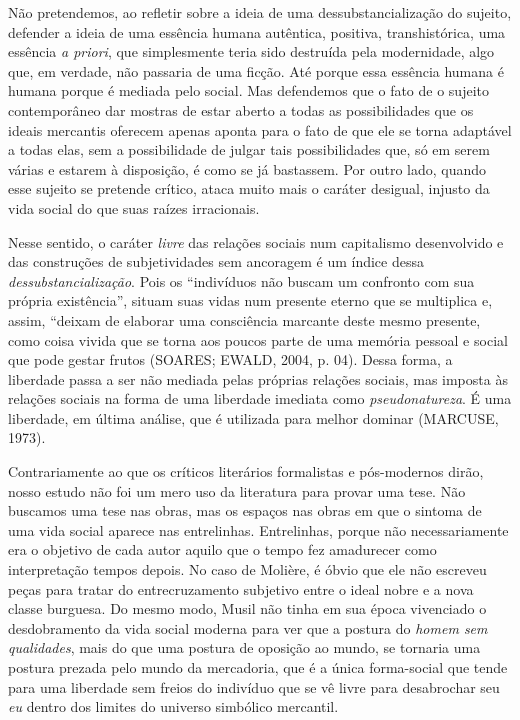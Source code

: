 Não pretendemos, ao refletir sobre a ideia de uma dessubstancialização
do sujeito, defender a ideia de uma essência humana autêntica, positiva,
transhistórica, uma essência \emph{a priori}, que simplesmente teria
sido destruída pela modernidade, algo que, em verdade, não passaria de
uma ficção. Até porque essa essência humana é humana porque é mediada
pelo social. Mas defendemos que o fato de o sujeito contemporâneo dar
mostras de estar aberto a todas as possibilidades que os ideais
mercantis oferecem apenas aponta para o fato de que ele se torna
adaptável a todas elas, sem a possibilidade de julgar tais
possibilidades que, só em serem várias e estarem à disposição, é como se
já bastassem. Por outro lado, quando esse sujeito se pretende crítico,
ataca muito mais o caráter desigual, injusto da vida social do que suas
raízes irracionais.

Nesse sentido, o caráter \emph{livre} das relações sociais num
capitalismo desenvolvido e das construções de subjetividades sem
ancoragem é um índice dessa \emph{dessubstancialização}. Pois os
``indivíduos não buscam um confronto com sua própria existência'',
situam suas vidas num presente eterno que se multiplica e, assim,
``deixam de elaborar uma consciência marcante deste mesmo presente, como
coisa vivida que se torna aos poucos parte de uma memória pessoal e
social que pode gestar frutos (SOARES; EWALD, 2004, p. 04). Dessa forma,
a liberdade passa a ser não mediada pelas próprias relações sociais, mas
imposta às relações sociais na forma de uma liberdade imediata como
\emph{pseudonatureza}. É uma liberdade, em última análise, que é
utilizada para melhor dominar (MARCUSE, 1973).

Contrariamente ao que os críticos literários formalistas e pós-modernos
dirão, nosso estudo não foi um mero uso da literatura para provar uma
tese. Não buscamos uma tese nas obras, mas os espaços nas obras em que o
sintoma de uma vida social aparece nas entrelinhas. Entrelinhas, porque
não necessariamente era o objetivo de cada autor aquilo que o tempo fez
amadurecer como interpretação tempos depois. No caso de Molière, é óbvio
que ele não escreveu peças para tratar do entrecruzamento subjetivo
entre o ideal nobre e a nova classe burguesa. Do mesmo modo, Musil não
tinha em sua época vivenciado o desdobramento da vida social moderna
para ver que a postura do \emph{homem sem qualidades}, mais do que uma
postura de oposição ao mundo, se tornaria uma postura prezada pelo mundo
da mercadoria, que é a única forma-social que tende para uma liberdade
sem freios do indivíduo que se vê livre para desabrochar seu \emph{eu}
dentro dos limites do universo simbólico mercantil.

